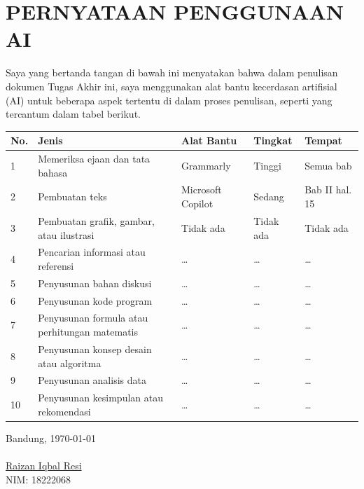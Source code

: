 \chapter*{PERNYATAAN PENGGUNAAN AI}
Saya yang bertanda tangan di bawah ini menyatakan bahwa dalam penulisan dokumen Tugas Akhir ini,
saya menggunakan alat bantu kecerdasan artifisial (AI) untuk beberapa aspek tertentu di dalam proses penulisan,
seperti yang tercantum dalam tabel berikut.
\begin{table}[h]
\begin{tabular}{|p{0.5cm}| p{4cm} | p{2.5cm} | p{2.5cm} | p{3cm} @{}| }
\hline
\textbf{No.} & \textbf{Jenis} & \textbf{Alat Bantu} & \textbf{Tingkat} & \textbf{Tempat}\\
\hline
1 & Memeriksa ejaan dan tata bahasa & Grammarly & Tinggi & Semua bab \\
\hline
2 & Pembuatan teks & Microsoft Copilot & Sedang & Bab II hal. 15 \\
\hline
3 & Pembuatan grafik, gambar, atau ilustrasi & Tidak ada & Tidak ada & Tidak ada \\
\hline
4 & Pencarian informasi atau referensi & \ldots & \ldots & \ldots \\
\hline
5 & Penyusunan bahan diskusi & \ldots & \ldots & \ldots \\
\hline
6 & Penyusunan kode program & \ldots & \ldots & \ldots \\
\hline
7 & Penyusunan formula atau perhitungan matematis & \ldots & \ldots & \ldots \\
\hline
8 & Penyusunan konsep desain atau algoritma & \ldots & \ldots & \ldots \\
\hline
9 & Penyusunan analisis data & \ldots & \ldots & \ldots \\
\hline
10 & Penyusunan kesimpulan atau rekomendasi & \ldots & \ldots & \ldots \\
\hline
\end{tabular}
\end{table}


Bandung, \today\\
\\[2cm]

\underline{Raizan Iqbal Resi} \\
NIM: 18222068